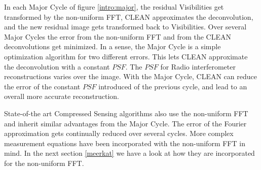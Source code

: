 In each Major Cycle of figure \ref{intro:major}, the residual Visibilities get transformed by the non-uniform FFT, CLEAN approximates the deconvolution, and the new residual image gets transformed back to Visibilities. Over several Major Cycles the error from the non-uniform FFT and from the CLEAN deconvolutions get minimized. In a sense, the Major Cycle is a simple optimization algorithm for two different errors. This lets CLEAN approximate the deconvolution with a constant $PSF$. The $PSF$ for Radio interferometer reconstructions varies over the image. With the Major Cycle, CLEAN can reduce the error of the constant $PSF$ introduced of the previous cycle, and lead to an overall more accurate reconstruction.



State-of-the art Compressed Sensing algorithms also use the non-uniform FFT and inherit similar advantages from the Major Cycle. The error of the Fourier approximation gets continually reduced over several cycles. More complex measurement equations have been incorporated with the non-uniform FFT in mind. In the next section \ref{meerkat} we have a look at how they are incorporated for the non-uniform FFT.



 







